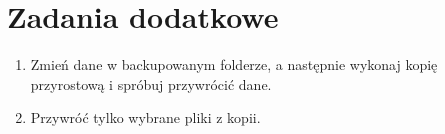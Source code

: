 \documentclass[polish]{article}
\begin{document}
\section*{Zadania dodatkowe}

\begin{enumerate}

\item Zmień dane w backupowanym folderze, a następnie wykonaj kopię przyrostową i spróbuj przywrócić dane.

\item Przywróć tylko wybrane pliki z kopii.

\end{enumerate}
\end{document}

